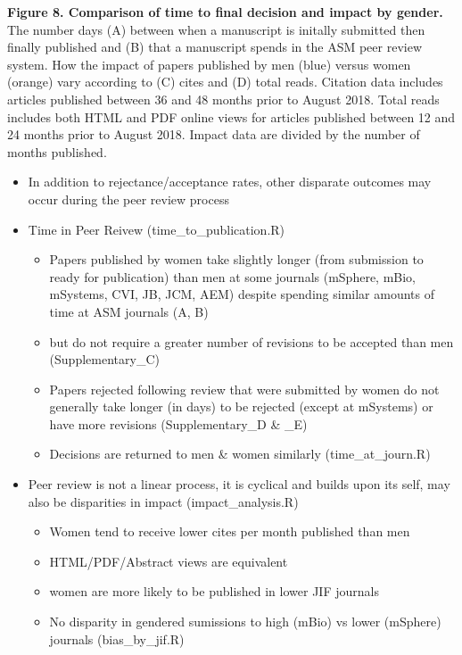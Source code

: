 \documentclass[11pt,]{article}
\providecommand{\tightlist}{%
  \setlength{\itemsep}{0pt}\setlength{\parskip}{0pt}}
\begin{document}
\textbf{Figure 8. Comparison of time to final decision and impact by
gender.} The number days (A) between when a manuscript is initally
submitted then finally published and (B) that a manuscript spends in the
ASM peer review system. How the impact of papers published by men (blue)
versus women (orange) vary according to (C) cites and (D) total reads.
Citation data includes articles published between 36 and 48 months prior
to August 2018. Total reads includes both HTML and PDF online views for
articles published between 12 and 24 months prior to August 2018. Impact
data are divided by the number of months published.

\begin{itemize}
\tightlist
\item
  In addition to rejectance/acceptance rates, other disparate outcomes
  may occur during the peer review process
\item
  Time in Peer Reivew (time\_to\_publication.R)

  \begin{itemize}
  \tightlist
  \item
    Papers published by women take slightly longer (from submission to
    ready for publication) than men at some journals (mSphere, mBio,
    mSystems, CVI, JB, JCM, AEM) despite spending similar amounts of
    time at ASM journals (A, B)
  \item
    but do not require a greater number of revisions to be accepted than
    men (Supplementary\_C)
  \item
    Papers rejected following review that were submitted by women do not
    generally take longer (in days) to be rejected (except at mSystems)
    or have more revisions (Supplementary\_D \& \_E)
  \item
    Decisions are returned to men \& women similarly (time\_at\_journ.R)
  \end{itemize}
\item
  Peer review is not a linear process, it is cyclical and builds upon
  its self, may also be disparities in impact (impact\_analysis.R)

  \begin{itemize}
  \tightlist
  \item
    Women tend to receive lower cites per month published than men
  \item
    HTML/PDF/Abstract views are equivalent
  \item
    women are more likely to be published in lower JIF journals
  \item
    No disparity in gendered sumissions to high (mBio) vs lower
    (mSphere) journals (bias\_by\_jif.R)
  \end{itemize}
\end{itemize}
\end{document}
